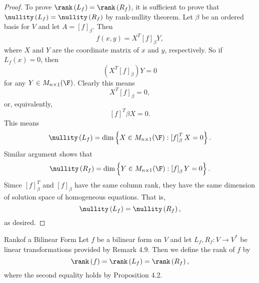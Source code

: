 \documentclass[linearalgebraII]{subfiles}
\begin{document}
    \begin{proof}
        To prove $\rank\left( L_f \right) = \rank\left( R_f \right)$, it is sufficient to prove that $\nullity\left( L_f \right) = \nullity\left( R_f \right)$ by rank-nullity theorem. Let $\beta$ be an ordered basis for $V$ and let $A=\left[ f \right] _\beta$. Then
        \begin{equation*}
            f\left( x,y \right) = X^T\left[ f \right] _\beta Y,
        \end{equation*}
        where $X$ and $Y$ are the coordinate matrix of $x$ and $y$, respectively. So if $L_f(x)=0$, then
        \begin{equation*}
            \left( X^T\left[ f \right] _\beta \right) Y = 0
        \end{equation*}
        for any $Y\in M_{n\times 1}(\F)$. Clearly this means
        \begin{equation*}
            X^T\left[ f \right] _\beta = 0,
        \end{equation*}
        or, equivalently,
        \begin{equation*}
            \left[ f \right] ^T\beta X = 0.
        \end{equation*}
        This means
        \begin{equation*}
            \nullity\left( L_f \right) = \dim \left\lbrace X\in M_{n\times 1}(\F): \left[ f \right] ^T_\beta X = 0  \right\rbrace  .
        \end{equation*}
        Similar argument shows that
        \begin{equation*}
            \nullity\left( R_f \right) = \dim\left\lbrace Y\in M_{n\times 1}(\F): \left[ f \right] _\beta Y = 0  \right\rbrace .
        \end{equation*}
        Simce $\left[ f \right] ^T_\beta$ and $\left[ f \right] _\beta$ have the same column rank, they have the same dimension of solution space of homogeneous equations. That is,
        \begin{equation*}
            \nullity\left( L_f \right) = \nullity\left( R_f \right),
        \end{equation*}
        as desired.
    \end{proof}

    \begin{definition}{Rank}{of a Bilinear Form}
        Let $f$ be a bilinear form on $V$ and let $L_f, R_f: V\to V^*$ be linear transformations provided by Remark 4.9. Then we define the rank of $f$ by
        \begin{equation*}
            \rank\left( f \right) = \rank\left( L_f \right) = \rank\left( R_f \right),
        \end{equation*}
        where the second equality holds by Proposition 4.2.
    \end{definition}
\end{document}
